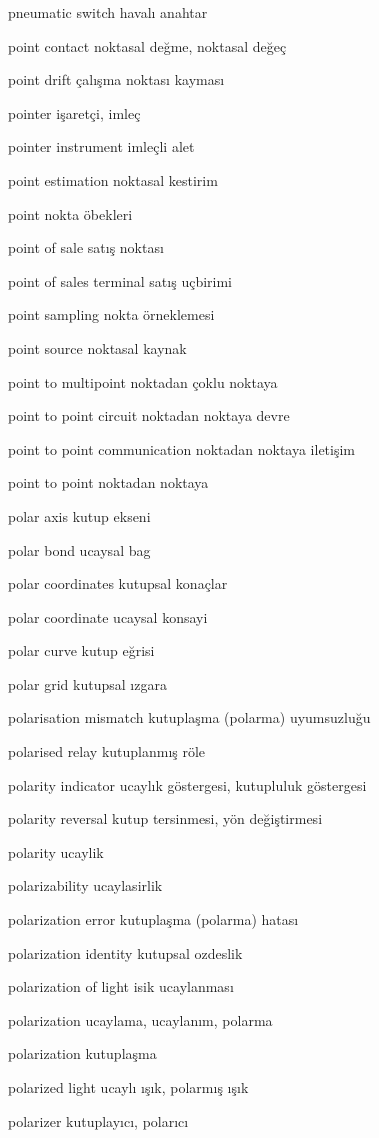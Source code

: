 \documentclass[12pt,fleqn]{article}\usepackage{../../common}
\begin{document}
pneumatic switch havalı anahtar

point contact noktasal değme, noktasal değeç

point drift çalışma noktası kayması

pointer işaretçi, imleç

pointer instrument imleçli alet

point estimation noktasal kestirim

point nokta öbekleri

point of sale satış noktası

point of sales terminal satış uçbirimi

point sampling nokta örneklemesi

point source noktasal kaynak

point to multipoint noktadan çoklu noktaya

point to point circuit noktadan noktaya devre

point to point communication noktadan noktaya iletişim

point to point noktadan noktaya

polar axis kutup ekseni

polar bond ucaysal bag

polar coordinates kutupsal konaçlar

polar coordinate ucaysal konsayi

polar curve kutup eğrisi

polar grid kutupsal ızgara

polarisation mismatch kutuplaşma (polarma) uyumsuzluğu

polarised relay kutuplanmış röle

polarity indicator ucaylık göstergesi, kutupluluk göstergesi

polarity reversal kutup tersinmesi, yön değiştirmesi

polarity ucaylik

polarizability ucaylasirlik

polarization error kutuplaşma (polarma) hatası

polarization identity kutupsal ozdeslik

polarization of light isik ucaylanması

polarization ucaylama, ucaylanım, polarma

polarization kutuplaşma

polarized light ucaylı ışık, polarmış ışık

polarizer kutuplayıcı, polarıcı
\end{document}
